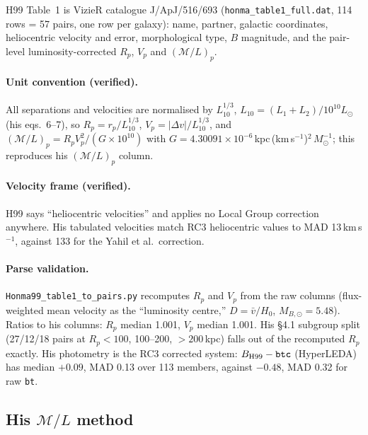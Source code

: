 \documentclass[11pt]{article}
\newcommand{\ML}{\ensuremath{\mathcal{M}/L}}
\begin{document}
H99 Table~1 is VizieR catalogue J/ApJ/516/693 (\texttt{honma\_table1\_full.dat},
114 rows = 57 pairs, one row per galaxy): name, partner, galactic coordinates,
heliocentric velocity and error, morphological type, $B$ magnitude, and the
pair-level luminosity-corrected $R_p$, $V_p$ and $(\ML)_p$.

\paragraph{Unit convention (verified).} All separations and velocities are
normalised by $L_{10}^{1/3}$, $L_{10} = (L_1+L_2)/10^{10}L_\odot$ (his
eqs.~6--7), so $R_p = r_p/L_{10}^{1/3}$, $V_p = |\Delta v|/L_{10}^{1/3}$, and
$(\ML)_p = R_p V_p^2/(G\times10^{10})$ with
$G = 4.30091\times10^{-6}$\,kpc\,(km\,s$^{-1}$)$^2\,M_\odot^{-1}$; this
reproduces his $(\ML)_p$ column.

\paragraph{Velocity frame (verified).} H99 says ``heliocentric velocities''
and applies no Local Group correction anywhere. His tabulated velocities match
RC3 heliocentric values to MAD 13\,km\,s$^{-1}$, against 133 for the Yahil et
al.\ correction.

\paragraph{Parse validation.} \texttt{Honma99\_table1\_to\_pairs.py} recomputes
$R_p$ and $V_p$ from the raw columns (flux-weighted mean velocity as the
``luminosity centre,'' $D = \bar v/H_0$, $M_{B,\odot} = 5.48$). Ratios to his
columns: $R_p$ median 1.001, $V_p$ median 1.001. His \S4.1 subgroup split
(27/12/18 pairs at $R_p <100$, 100--200, $>200$\,kpc) falls out of the
recomputed $R_p$ exactly. His photometry is the RC3 corrected system:
$B_{\rm H99} - \mathtt{btc}$ (HyperLEDA) has median $+0.09$, MAD 0.13 over 113
members, against $-0.48$, MAD 0.32 for raw \texttt{bt}.

\subsection{His \texorpdfstring{\ML}{M/L} method}
\label{sec:h99method}
\end{document}
